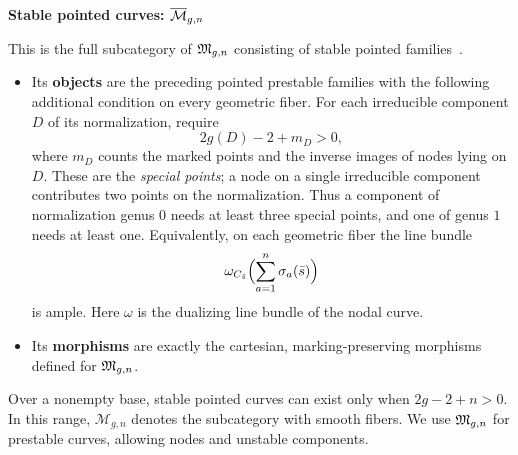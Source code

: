 \documentclass[12pt]{memoir}
\begin{document}
\begin{ptcb}
    \textbf{Stable pointed curves: \(\overline{\mathcal{M}}_{g,n}\)}\par
    This is the full subcategory of \(\mathfrak{M}_{g,n}\) consisting of stable pointed families~\cite{notes:fantechi-gw}.
    \begin{itemize}
        \item Its \textbf{objects} are the preceding pointed prestable families with the following additional condition on every geometric fiber. For each irreducible component \(D\) of its normalization, require
        \[
            2g(D)-2+m_D>0,
        \]
        where \(m_D\) counts the marked points and the inverse images of nodes lying on \(D\). These are the \emph{special points}; a node on a single irreducible component contributes two points on the normalization. Thus a component of normalization genus \(0\) needs at least three special points, and one of genus \(1\) needs at least one.
        Equivalently, on each geometric fiber the line bundle
        \[
            \omega_{C_{\bar s}}\Bigl(\sum_{a=1}^n\sigma_a(\bar s)\Bigr)
        \]
        is ample. Here \(\omega\) is the dualizing line bundle of the nodal curve.
        \item Its \textbf{morphisms} are exactly the cartesian, marking-preserving morphisms defined for \(\mathfrak{M}_{g,n}\).
    \end{itemize}
    Over a nonempty base, stable pointed curves can exist only when \(2g-2+n>0\). In this range, \(\mathcal{M}_{g,n}\) denotes the subcategory with smooth fibers. We use \(\mathfrak{M}_{g,n}\) for prestable curves, allowing nodes and unstable components.
\end{ptcb}
\end{document}
